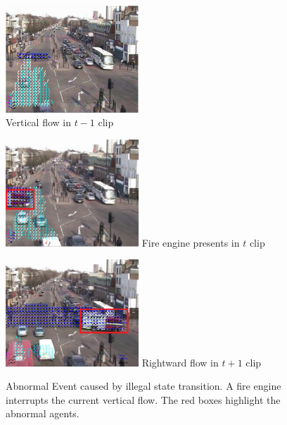 \begin{figure}[!htbp]
	\centering
	\begin{minipage}{0.26\textwidth}
		\includegraphics[width=5cm]{figures/qmul/fireengine_412-crop.pdf}\\
		\centering\scriptsize{Vertical flow in $t-1$ clip}
	\end{minipage}
	\hspace{1cm}
	\begin{minipage}{0.26\textwidth}
		\includegraphics[width=5cm]{figures/qmul/abnormal/fireengine_413.png}
		\centering\scriptsize{Fire engine presents in $t$ clip}
	\end{minipage}
	\hspace{1cm}
	\begin{minipage}{0.26\textwidth}
		\includegraphics[width=5cm]{figures/qmul/abnormal/fireengine_414.png}
		\centering\scriptsize{Rightward flow in $t+1$ clip}
	\end{minipage}
	\caption[Abnormal Event caused by illegal state transition]{Abnormal Event caused by illegal state transition. A fire engine interrupts the current vertical flow. The red boxes highlight the abnormal agents. }
	\label{fig:illegal_transition}
\end{figure}

